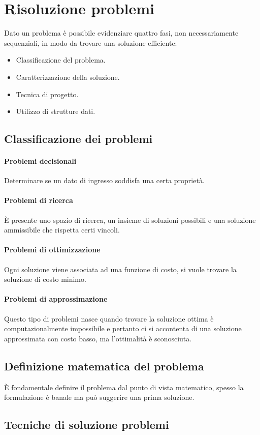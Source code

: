 \chapter{Risoluzione problemi}
Dato un problema \`e possibile evidenziare quattro fasi, non necessariamente sequenziali, in modo da trovare una soluzione efficiente:
\begin{itemize}
\item Classificazione del problema.
\item Caratterizzazione della soluzione.
\item Tecnica di progetto.
\item Utilizzo di strutture dati.
\end{itemize}
\section{Classificazione dei problemi}
\subsubsection{Problemi decisionali}
Determinare se un dato di ingresso soddisfa una certa propriet\`a.
\subsubsection{Problemi di ricerca}
\`E presente uno spazio di ricerca, un insieme di soluzioni possibili e una soluzione ammissibile  che rispetta certi vincoli.
\subsubsection{Problemi di ottimizzazione}
Ogni soluzione viene associata ad una funzione di costo, si vuole trovare la soluzione di costo minimo.
\subsubsection{Problemi di approssimazione}
Questo tipo di problemi nasce quando trovare la soluzione ottima \`e computazionalmente impossibile e pertanto ci si accontenta di una soluzione approssimata con costo basso, ma l'ottimalit\`a \`e sconosciuta.
\section{Definizione matematica del problema}
\`E fondamentale definire il problema dal punto di vista matematico, spesso la formulazione \`e banale ma pu\`o suggerire una prima soluzione. 
\section{Tecniche di soluzione problemi}
